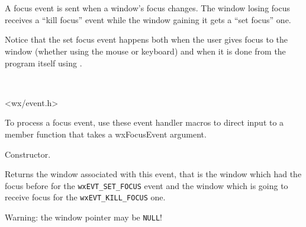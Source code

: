\section{}\label{wxfocusevent}

A focus event is sent when a window's focus changes. The window losing focus
receives a ``kill focus'' event while the window gaining it gets a ``set
focus'' one.

Notice that the set focus event happens both when the user gives focus to the
window (whether using the mouse or keyboard) and when it is done from the
program itself using .


\\


<wx/event.h>


To process a focus event, use these event handler macros to direct input to a member
function that takes a wxFocusEvent argument.

\twocolwidtha{7cm}
\begin{twocollist}\itemsep=0pt
\end{twocollist}%





\label{wxfocuseventctor}


Constructor.


\label{wxfocuseventgetwindow}

Returns the window associated with this event, that is the window which had the
focus before for the \texttt{wxEVT\_SET\_FOCUS} event and the window which is
going to receive focus for the \texttt{wxEVT\_KILL\_FOCUS} one.

Warning: the window pointer may be \texttt{NULL}!

